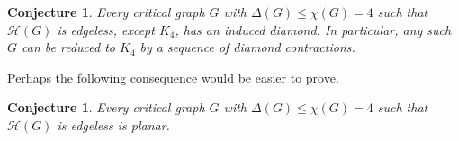 \documentclass[12pt]{article}
\theoremstyle{plain}
\newtheorem{conjecture}[thm]{Conjecture}
\theoremstyle{definition}
\theoremstyle{remark}
\newcommand{\fancy}[1]{\mathcal{#1}}
\newcommand{\HH}{\fancy{H}}
\begin{document}
\begin{conjecture}
Every critical graph $G$ with $\Delta(G) \leq \chi(G) = 4$ such that $\HH(G)$ is edgeless, except $K_4$, has an induced diamond. In particular, any such $G$ can be reduced to $K_4$ by a sequence of diamond contractions.
\end{conjecture}

\noindent Perhaps the following consequence would be easier to prove.

\begin{conjecture}
Every critical graph $G$ with $\Delta(G) \leq \chi(G) = 4$ such that $\HH(G)$ is edgeless is planar.
\end{conjecture}





\end{document}
